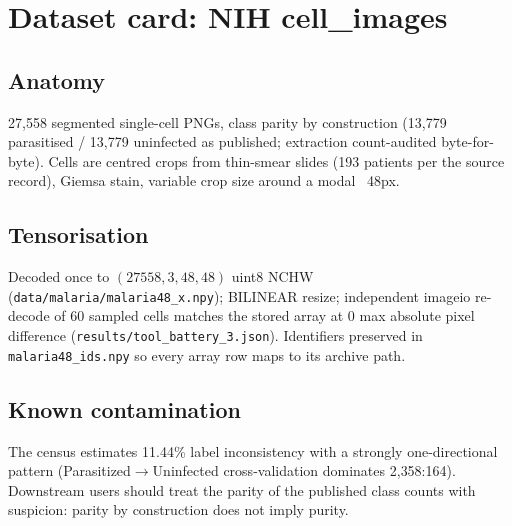 
\section{Dataset card: NIH cell\_images}
\subsection{Anatomy}
27{,}558 segmented single-cell PNGs, class parity by construction
(13{,}779 parasitised / 13{,}779 uninfected as published; extraction
count-audited byte-for-byte). Cells are centred crops from thin-smear
slides (193 patients per the source record), Giemsa stain, variable crop
size around a modal ~48px.
\subsection{Tensorisation}
Decoded once to $(27558, 3, 48, 48)$ uint8 NCHW
(\texttt{data/malaria/malaria48\_x.npy}); BILINEAR resize; independent
imageio re-decode of 60 sampled cells matches the stored array at 0 max
absolute pixel difference (\texttt{results/tool\_battery\_3.json}).
Identifiers preserved in \texttt{malaria48\_ids.npy} so every array row
maps to its archive path.
\subsection{Known contamination}
The census estimates 11.44\% label inconsistency with a strongly
one-directional pattern (Parasitized$\to$Uninfected cross-validation
dominates 2{,}358:164). Downstream users should treat the parity of the
published class counts with suspicion: parity by construction does not
imply purity.
